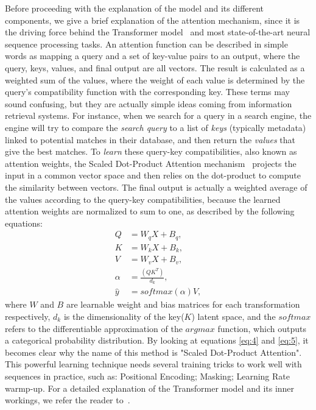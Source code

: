 \documentclass{article}
\begin{document}
Before proceeding with the explanation of the model and its different components, we give a brief explanation of the attention mechanism, since it is the driving force behind the Transformer model~\cite{vaswani2017attention} and most state-of-the-art neural sequence processing tasks. An attention function can be described in simple words as mapping a query and a set of key-value pairs to an output, where the query, keys, values, and final output are all vectors. The result is calculated as a weighted sum of the values, where the weight of each value is determined by the query's compatibility function with the corresponding key. These terms may sound confusing, but they are actually simple ideas coming from information retrieval systems. For instance, when we search for a query in a search engine, the engine will try to compare the \textit{search query} to a list of \textit{keys} (typically metadata) linked to potential matches in their database, and then return the \textit{values} that give the best matches. To \emph{learn} these query-key compatibilities, also known as attention weights, the Scaled Dot-Product Attention mechanism~\cite{vaswani2017attention} projects the input in a common vector space and then relies on the dot-product to compute the similarity between vectors. The final output is actually a weighted average of the values according to the query-key compatibilities, because the learned attention weights are normalized to sum to one, as described by the following equations:
\begin{align}
     Q & = {W_q}X + B_q, \label{eq:1} \\
     K & = {W_k}X + B_k, \label{eq:2} \\
     V & = {W_v}X + B_v, \label{eq:3} \\
     \alpha & = \frac{(QK^T)}{d_k}, \label{eq:4} \\
     \hat{y} & = softmax(\alpha)V, \label{eq:5}
\end{align}
where $W$ and $B$ are learnable weight and bias matrices for each transformation respectively, $d_k$ is the dimensionality of the key($K$) latent space, and the $softmax$ refers to the differentiable approximation of the $argmax$ function, which outputs a categorical probability distribution. By looking at equations \ref{eq:4} and \ref{eq:5}, it becomes clear why the name of this method is "Scaled Dot-Product Attention". This powerful learning technique needs several training tricks to work well with sequences in practice, such as: Positional Encoding; Masking; Learning Rate warmp-up. For a detailed explanation of the Transformer model and its inner workings, we refer the reader to~\cite{vaswani2017attention}.  
\end{document}
